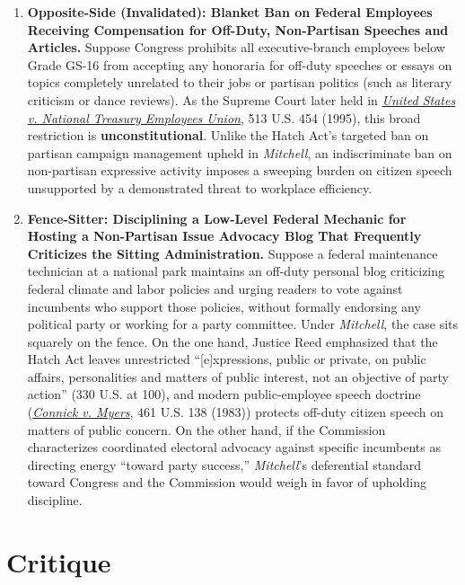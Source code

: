 \documentclass[12pt]{article}
\begin{document}
\begin{enumerate}
\item \textbf{Opposite-Side (Invalidated): Blanket Ban on Federal Employees Receiving Compensation for Off-Duty, Non-Partisan Speeches and Articles.} Suppose Congress prohibits all executive-branch employees below Grade GS-16 from accepting any honoraria for off-duty speeches or essays on topics completely unrelated to their jobs or partisan politics (such as literary criticism or dance reviews). As the Supreme Court later held in \href{https://www.law.cornell.edu/supremecourt/text/513/454}{\textit{United States v. National Treasury Employees Union}}, 513 U.S. 454 (1995), this broad restriction is \textbf{unconstitutional}. Unlike the Hatch Act's targeted ban on partisan campaign management upheld in \textit{Mitchell}, an indiscriminate ban on non-partisan expressive activity imposes a sweeping burden on citizen speech unsupported by a demonstrated threat to workplace efficiency.
\item \textbf{Fence-Sitter: Disciplining a Low-Level Federal Mechanic for Hosting a Non-Partisan Issue Advocacy Blog That Frequently Criticizes the Sitting Administration.} Suppose a federal maintenance technician at a national park maintains an off-duty personal blog criticizing federal climate and labor policies and urging readers to vote against incumbents who support those policies, without formally endorsing any political party or working for a party committee. Under \textit{Mitchell}, the case sits squarely on the fence. On the one hand, Justice Reed emphasized that the Hatch Act leaves unrestricted ``[e]xpressions, public or private, on public affairs, personalities and matters of public interest, not an objective of party action'' (330 U.S. at 100), and modern public-employee speech doctrine (\href{https://www.law.cornell.edu/supremecourt/text/461/138}{\textit{Connick v. Myers}}, 461 U.S. 138 (1983)) protects off-duty citizen speech on matters of public concern. On the other hand, if the Commission characterizes coordinated electoral advocacy against specific incumbents as directing energy ``toward party success,'' \textit{Mitchell}'s deferential standard toward Congress and the Commission would weigh in favor of upholding discipline.
\end{enumerate}

\section{Critique}
\end{document}
